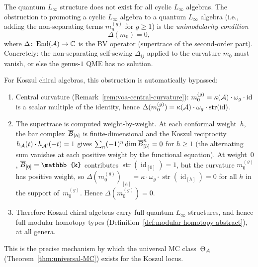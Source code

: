 \begin{remark}
\label{rem:unimodularity-obstruction}
The quantum $L_\infty$ structure does not exist for all cyclic
$L_\infty$ algebras.  The obstruction to promoting a cyclic
$L_\infty$ algebra to a quantum $L_\infty$ algebra (i.e., adding
the non-separating terms $m_n^{(g)}$ for $g \geq 1$) is the
\emph{unimodularity condition}
\begin{equation}\label{eq:unimodularity}
\Delta(m_0) = 0,
\end{equation}
where $\Delta\colon \operatorname{End}(\mathcal{A}) \to \mathbb{C}$ is the
BV operator (supertrace of the second-order part).
Concretely: the non-separating self-sewing $\Delta_{ij}$ applied to
the curvature $m_0$ must vanish, or else the genus-$1$ QME has no
solution.

For Koszul chiral algebras, this obstruction is automatically
bypassed:
\begin{enumerate}[label=\textup{(\alph*)}]
\item Central curvature
  (Remark~\ref{rem:voa-central-curvature}):
  $m_0^{(g)} = \kappa(\mathcal{A}) \cdot \omega_g \cdot \operatorname{id}$
  is a scalar multiple of the identity, hence
  $\Delta(m_0^{(g)}) = \kappa(\mathcal{A}) \cdot \omega_g
  \cdot \operatorname{str}(\operatorname{id})$.
\item The supertrace is computed weight-by-weight.
  At each conformal weight~$h$, the bar complex
  $\overline{B}_{[h]}$ is finite-dimensional and the Koszul
  reciprocity $h_{\mathcal{A}}(t) \cdot h_{\mathcal{A}^!}(-t) = 1$
  \cite[Theorem~3.5.1]{LV12} gives
  $\sum_n (-1)^n \dim \overline{B}^n_{[h]} = 0$ for $h \geq 1$
  (the alternating sum vanishes at each positive weight by
  the functional equation).  At weight~$0$,
  $\barB_{[0]} = \mathbb{k}$ contributes
  $\operatorname{str}(\operatorname{id}_{[0]}) = 1$, but
  the curvature $m_0^{(g)}$ has positive weight, so
  $\Delta(m_0^{(g)})_{[h]} = \kappa \cdot \omega_g \cdot
  \operatorname{str}(\operatorname{id}_{[h]}) = 0$
  for all $h$ in the support of~$m_0^{(g)}$.
  Hence $\Delta(m_0^{(g)}) = 0$.
\item Therefore Koszul chiral algebras carry full quantum
  $L_\infty$ structures, and hence full modular homotopy types
  (Definition~\ref{def:modular-homotopy-abstract}), at all genera.
\end{enumerate}
This is the precise mechanism by which the universal MC
class~$\Theta_{\mathcal{A}}$
(Theorem~\ref{thm:universal-MC}) exists for the Koszul locus.
\end{remark}

